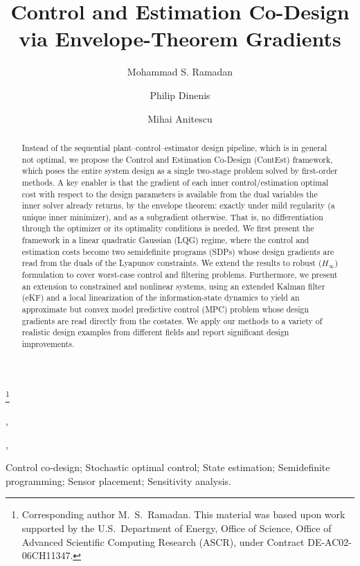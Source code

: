 \documentclass[twocolumn,amsthm]{autart}
\begin{document}
\begin{frontmatter}

\title{Control and Estimation Co-Design via Envelope-Theorem Gradients}

 \thanks[footnoteinfo]{Corresponding author M.~S.~Ramadan. This material was
 based upon work supported by the U.S.\ Department of Energy, Office of Science,
 Office of Advanced Scientific Computing Research (ASCR), under Contract
 DE-AC02-06CH11347.}

\author[anl]{Mohammad S. Ramadan},
\author[anl]{Philip Dinenis},
\author[anl]{Mihai Anitescu}

\address[anl]{Mathematics and Computer Science Division, Argonne National
Laboratory, Lemont, IL 60439, USA}

\begin{keyword}
Control co-design; Stochastic optimal control; State estimation;
Semidefinite programming; Sensor placement; Sensitivity analysis.
\end{keyword}

\begin{abstract}
Instead of the sequential plant--control--estimator design pipeline, which is in general not optimal,
we propose the Control and Estimation Co-Design (ContEst) framework, which poses the entire system design as a single two-stage problem solved by first-order methods. A key
enabler is that the gradient of each inner control/estimation optimal cost with
respect to the design parameters is available from the dual variables
the inner solver already returns, by the envelope theorem: exactly under mild
regularity (a unique inner minimizer), and as a subgradient otherwise. That is, no differentiation
through the optimizer or its optimality conditions is needed. We first present the
framework in a linear quadratic Gaussian (LQG) regime, where the control and
estimation costs become two semidefinite programs (SDPs) whose design gradients are
read from the duals of the Lyapunov constraints. We extend the results to robust ($H_\infty$)
formulation to cover worst-case control and filtering problems. Furthermore, we present an extension to constrained and nonlinear systems, using an extended Kalman filter (eKF) and a local linearization of the information-state dynamics to yield an approximate but convex model predictive control (MPC) problem whose design gradients are read directly from the costates. We apply our methods to a variety of realistic design examples from different fields and report significant design improvements.
\end{abstract}

\end{frontmatter}
\end{document}

